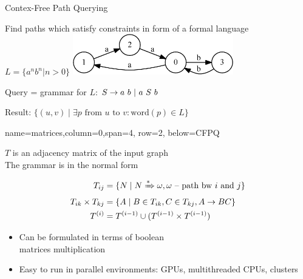 \documentclass[a0paper,portrait]{baposter}
\begin{document}
\begin{poster}
\begin{posterbox}[name=CFPQ,column=0,row=0, span=4]{Contex-Free Path Querying}

  Find paths which satisfy constraints in form of a formal language $L=\{a^n b^n | n > 0\}$
    \includegraphics[width=7cm]{example_graph_transparent.png}

    Query = grammar for $L$: $S  \rightarrow a  \ b \ | \ a \ S \ b  \\$

  Result: $ \{(u,v) \mid \exists p \text{ from } u \text{ to } v: \text{word}(p) \in L\} $

\end{posterbox}

{name=matrices,column=0,span=4, row=2, below=CFPQ}%
{

$T$ is an adjacency matrix of the input graph\\
The grammar is in the normal form
\vspace{-0.5cm}

\begin{align*}
T_{ij} &=\{ N \mid N \xRightarrow[]{*} \omega,  \omega \text{ -- path bw } i \text{ and } j \} \\
T_{ik} \times T_{kj} &= \{ A \mid B \in T_{ik}, C \in T_{kj}, A \rightarrow B C \} \\
T^{(i)} &= T^{(i-1)} \cup (T^{(i-1)} \times T^{(i-1)})
\end{align*}

\begin{itemize}
  \item Can be formulated in terms of boolean \\ matrices multiplication
  \item Easy to run in parallel environments: GPUs, multithreaded CPUs, clusters
\end{itemize}
\vspace{0.3cm}
}


\end{poster}
\end{document}
